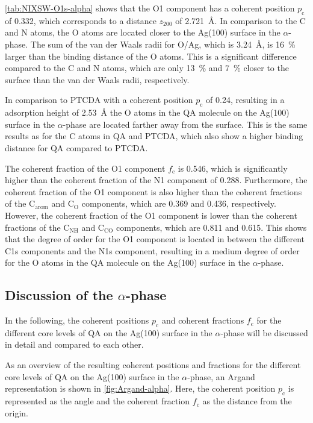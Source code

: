 \autoref{tab:NIXSW-O1s-alpha} shows that the O1 component has a coherent position $p_\mathrm{c}$ of 0.332, which corresponds to a distance $z_{200}$ of 2.721~\si{\angstrom}. In comparison to the C and N atoms, the O atoms are located closer to the Ag(100) surface in the $\alpha$-phase. The sum of the van der Waals radii for O/Ag, which is 3.24~\si{\angstrom}\autocite{Bondi1964}, is 16~\% larger than the binding distance of the O atoms. This is a significant difference compared to the C and N atoms, which are only 13~\% and 7~\% closer to the surface than the van der Waals radii, respectively. 

In comparison to \ac{PTCDA} with a coherent position $p_\mathrm{c}$ of 0.24, resulting in a adsorption height of 2.53~\si{\angstrom}\autocite{Bauer2014} the O atoms in the \ac{QA} molecule on the Ag(100) surface in the $\alpha$-phase are located farther away from the surface. This is the same results as for the C atoms in \ac{QA} and \ac{PTCDA}, which also show a higher binding distance for \ac{QA} compared to \ac{PTCDA}.

The coherent fraction of the O1 component $f_\mathrm{c}$ is 0.546, which is significantly higher than the coherent fraction of the N1 component of 0.288. Furthermore, the coherent fraction of the O1 component is also higher than the coherent fractions of the $\mathrm{C_{arom}}$ and $\mathrm{C_{O}}$ components, which are 0.369 and 0.436, respectively. However, the coherent fraction of the O1 component is lower than the coherent fractions of the $\mathrm{C_{NH}}$ and $\mathrm{C_{CO}}$ components, which are 0.811 and 0.615. This shows that the degree of order for the O1 component is located in between the different C1s components and the N1s component, resulting in a medium degree of order for the O atoms in the \ac{QA} molecule on the Ag(100) surface in the $\alpha$-phase.
 

\newpage
\subsection{Discussion of the \texorpdfstring{$\alpha$}{alpha}-phase}

In the following, the coherent positions $p_\mathrm{c}$ and coherent fractions $f_\mathrm{c}$ for the different core levels of \ac{QA} on the Ag(100) surface in the $\alpha$-phase will be discussed in detail and compared to each other.

As an overview of the resulting coherent positions and fractions for the different core levels of \ac{QA} on the Ag(100) surface in the $\alpha$-phase, an Argand representation is shown in \autoref{fig:Argand-alpha}. Here, the coherent position $p_\mathrm{c}$ is represented as the angle and the coherent fraction $f_\mathrm{c}$ as the distance from the origin.

